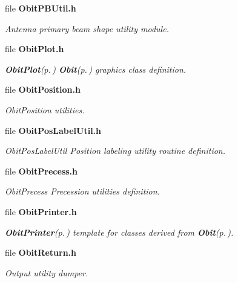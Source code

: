 \begin{CompactItemize}
\item 
file {\bf Obit\-PBUtil.h}
\begin{CompactList}\small\item\em Antenna primary beam shape utility module. \item\end{CompactList}

\item 
file {\bf Obit\-Plot.h}
\begin{CompactList}\small\item\em {\bf Obit\-Plot}{\rm (p.\,\pageref{structObitPlot})} {\bf Obit}{\rm (p.\,\pageref{structObit})} graphics class definition. \item\end{CompactList}

\item 
file {\bf Obit\-Position.h}
\begin{CompactList}\small\item\em Obit\-Position utilities. \item\end{CompactList}

\item 
file {\bf Obit\-Pos\-Label\-Util.h}
\begin{CompactList}\small\item\em Obit\-Pos\-Label\-Util Position labeling utility routine definition. \item\end{CompactList}

\item 
file {\bf Obit\-Precess.h}
\begin{CompactList}\small\item\em Obit\-Precess Precession utilities definition. \item\end{CompactList}

\item 
file {\bf Obit\-Printer.h}
\begin{CompactList}\small\item\em {\bf Obit\-Printer}{\rm (p.\,\pageref{structObitPrinter})} template for classes derived from {\bf Obit}{\rm (p.\,\pageref{structObit})}. \item\end{CompactList}

\item 
file {\bf Obit\-Return.h}
\begin{CompactList}\small\item\em Output utility dumper. \item\end{CompactList}


\end{CompactItemize}
